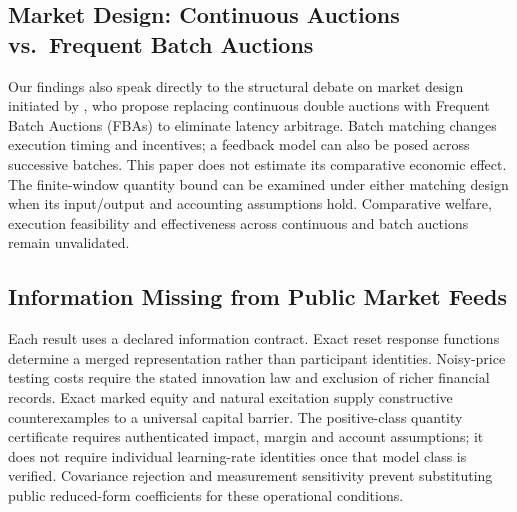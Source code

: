 \documentclass[12pt]{article}
\theoremstyle{definition}
\theoremstyle{remark}
\begin{document}
\subsection{Market Design: Continuous Auctions vs.\ Frequent Batch Auctions}
Our findings also speak directly to the structural debate on market design initiated by \citet{budish2015}, who propose replacing continuous double auctions with Frequent Batch Auctions (FBAs) to eliminate latency arbitrage. Batch matching changes execution timing and incentives; a feedback model can also be posed across successive batches. This paper does not estimate its comparative economic effect. The finite-window quantity bound can be examined under either matching design when its input/output and accounting assumptions hold. Comparative welfare, execution feasibility and effectiveness across continuous and batch auctions remain unvalidated.

\subsection{Information Missing from Public Market Feeds}
\label{sec:missing_info}
Each result uses a declared information contract. Exact reset response functions determine a merged representation rather than participant identities. Noisy-price testing costs require the stated innovation law and exclusion of richer financial records. Exact marked equity and natural excitation supply constructive counterexamples to a universal capital barrier. The positive-class quantity certificate requires authenticated impact, margin and account assumptions; it does not require individual learning-rate identities once that model class is verified. Covariance rejection and measurement sensitivity prevent substituting public reduced-form coefficients for these operational conditions.
\end{document}
